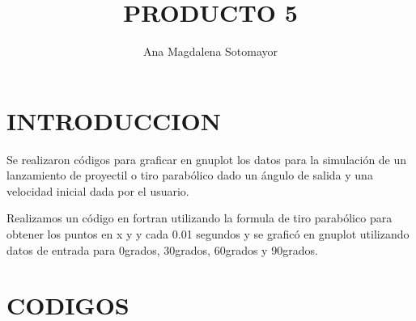 \documentclass[letterpaper,10pt,twoside,onecolumn]{article}
\begin{document}
 
\title{PRODUCTO 5} 
\author{Ana Magdalena Sotomayor} 

\maketitle 
\section{INTRODUCCION}
Se realizaron códigos para graficar en gnuplot los datos para la simulación de un lanzamiento de proyectil o tiro parabólico dado un ángulo de salida y una velocidad inicial dada por el usuario. 
 
Realizamos un código en fortran utilizando la formula de tiro parabólico para obtener los puntos en x y y cada 0.01 segundos y se graficó en gnuplot utilizando datos de entrada para 0grados, 30grados, 60grados y 90grados. 


\section{CODIGOS} 
\end{document}
